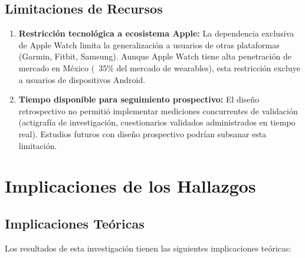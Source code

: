 \subsection{Limitaciones de Recursos}
\label{subsec:limitaciones_recursos}

\begin{enumerate}
    \item \textbf{Restricción tecnológica a ecosistema Apple:} La dependencia exclusiva de Apple Watch limita la generalización a usuarios de otras plataformas (Garmin, Fitbit, Samsung). Aunque Apple Watch tiene alta penetración de mercado en México (~35\% del mercado de wearables), esta restricción excluye a usuarios de dispositivos Android.
    
    \item \textbf{Tiempo disponible para seguimiento prospectivo:} El diseño retrospectivo no permitió implementar mediciones concurrentes de validación (actigrafía de investigación, cuestionarios validados administrados en tiempo real). Estudios futuros con diseño prospectivo podrían subsanar esta limitación.
\end{enumerate}


\section{Implicaciones de los Hallazgos}
\label{sec:implicaciones}

\subsection{Implicaciones Teóricas}
\label{subsec:implicaciones_teoricas}

Los resultados de esta investigación tienen las siguientes implicaciones teóricas:

